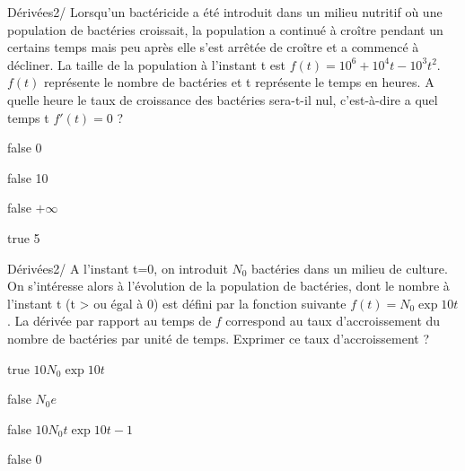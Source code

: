 \documentclass[11pt]{article}
\begin{document}
			
			\begin{question}{22}{Dérivées}{2}{/}
			  Lorsqu'un bactéricide a été introduit dans un milieu nutritif où une population de bactéries croissait, la population a continué à croître pendant un certains temps mais peu après elle s'est arrêtée de croître et a commencé à décliner. La taille de la population à l'instant t est $f(t) = 10^6 + 10^4 t - 10^3 t^2$. $f(t)$ représente le nombre de bactéries et t représente le temps en heures. A quelle heure le taux de croissance des bactéries sera-t-il nul, c'est-à-dire a quel temps t $f'(t)=0$ ?
            \end{question}

            \begin{reponses}
            	\item[false] 0
            	\item[false] 10
                \item[false]  $+\infty$ 
                \item[true]  5
            \end{reponses}
			
			
			\begin{question}{22}{Dérivées}{2}{/}
			 A l'instant t=0, on introduit $N_0$ bactéries dans un milieu de culture. On s'intéresse alors à l'évolution de la population de bactéries, dont le nombre à l'instant t (t > ou égal à 0) est défini par la fonction suivante $f(t) = N_0 \exp{10t}$. La dérivée par rapport au temps de $f$ correspond au taux d'accroissement du nombre de bactéries par unité de temps. Exprimer ce taux d'accroissement ?
            \end{question}

            \begin{reponses}
            	\item[true]   $10 N_0 \exp{10t} $
            	\item[false]  $N_0 e $
                \item[false]  $10 N_0 t \exp{10t-1} $
                \item[false]  $0 $
            \end{reponses}
			
			
		
	
            
\end{document}
